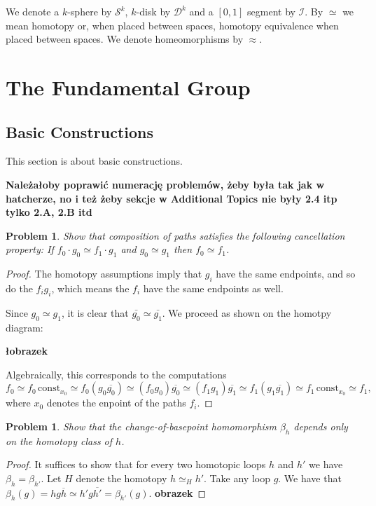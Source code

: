 \documentclass[11pt, a4paper, final]{amsart}
\newcommand\todo[1]{\textbf{\textcolor{redd}{#1}}}
\newcommand{\unit}{\mathcal{I}}
\newcommand{\sphere}{\mathcal{S}}
\newcommand{\disk}{\mathcal{D}}
\numberwithin{theorem}{section}
\newtheorem{problem}[theorem]{Problem}
\theoremstyle{definition}
\theoremstyle{remark}
\begin{document}
We denote a $k$-sphere by $\sphere^k$, $k$-disk by $\disk^k$ and a $[0, 1]$ segment by $\unit$. By $\simeq$ we mean homotopy or, when placed between spaces, homotopy equivalence when placed between spaces. We denote homeomorphisms by $\approx$.


\section{The Fundamental Group}

\subsection{Basic Constructions}

This section is about basic constructions.

\todo{Należałoby poprawić numerację problemów, żeby była tak jak w hatcherze, no i też żeby sekcje w Additional Topics nie były 2.4 itp tylko 2.A, 2.B itd}

\begin{problem}\label{problem: 1.1.1}
Show that composition of paths satisfies the following cancellation property: If
$f_0 \cdot g_0 \simeq f_1 \cdot g_1$ and $g_0 \simeq g_1$ then $f_0 \simeq f_1$.
\end{problem}

\begin{proof}
    The homotopy assumptions imply that $g_i$ have the same endpoints, and so do the $f_ig_i$, which means the $f_i$ have the same endpoints as well.

    Since $g_0 \simeq g_1$, it is clear that $\bar{g_0} \simeq \bar{g_1}$. We proceed as shown on the homotpy diagram:

    \todo{łobrazek}

    Algebraically, this corresponds to the computations
    \[
    f_0 \simeq f_0 \,\mathrm{const}_{x_0} \simeq f_0(g_0\overline{g_0}) \simeq (f_0g_0)\overline{g_0} \simeq (f_1g_1)\overline{g_1} \simeq f_1(g_1\overline{g_1})  \simeq f_1\,\mathrm{ const}_{x_0} \simeq f_1,
    \]
    where \(x_0\) denotes the enpoint of the paths $f_i$.
\end{proof}

\begin{problem}\label{problem: 1.1.2}
    Show that the change-of-basepoint homomorphism $\beta_h$ depends only on the homotopy class of $h$.
\end{problem}

\begin{proof}
    It suffices to show that for every two homotopic loops $h$ and $h'$ we have $\beta_h = \beta_{h'}$. Let $H$ denote the homotopy $h \simeq_{H} h'$. Take any loop $g$. We have that $\beta_h(g) = hg\overline{h} \simeq h'g\overline{h'} = \beta_{h'}(g)$. \todo{obrazek}
\end{proof}
\end{document}

